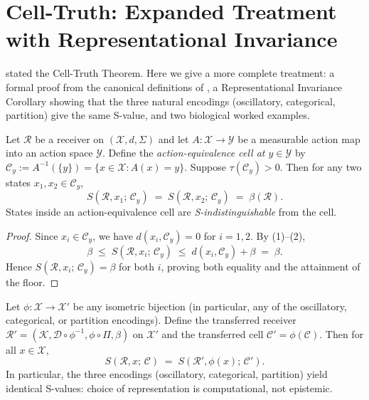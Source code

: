 \section{Cell-Truth: Expanded Treatment with Representational Invariance}
\label{sec:cell-truth-expanded}

 stated the Cell-Truth Theorem.  Here we give a more
complete treatment: a formal proof from the canonical definitions of
, a Representational
Invariance Corollary showing that the three natural encodings (oscillatory,
categorical, partition) give the same S-value, and two biological worked
examples.

\begin{theorem}
\label{thm:cell-truth-formal}
Let $\mathcal{R}$ be a receiver on $(\mathcal{X}, d, \Sigma)$ and let
$A : \mathcal{X} \to \mathcal{Y}$ be a measurable action map into an action
space $\mathcal{Y}$.  Define the \emph{action-equivalence cell at $y \in
\mathcal{Y}$} by $\mathcal{C}_y := A^{-1}(\{y\}) = \{x \in \mathcal{X} :
A(x) = y\}$.  Suppose $\tau(\mathcal{C}_y) > 0$.  Then for any two states
$x_1, x_2 \in \mathcal{C}_y$,
\[
  S(\mathcal{R}, x_1;\, \mathcal{C}_y)
  \;=\; S(\mathcal{R}, x_2;\, \mathcal{C}_y) \;=\; \beta(\mathcal{R}) .
\]
States inside an action-equivalence cell are \emph{S-indistinguishable} from
the cell.
\end{theorem}

\begin{proof}
Since $x_i \in \mathcal{C}_y$, we have $d(x_i, \mathcal{C}_y) = 0$ for
$i = 1, 2$.  By (1)--(2),
\[
  \beta \;\leq\; S(\mathcal{R}, x_i;\, \mathcal{C}_y)
  \;\leq\; d(x_i, \mathcal{C}_y) + \beta \;=\; \beta .
\]
Hence $S(\mathcal{R}, x_i;\, \mathcal{C}_y) = \beta$ for both $i$, proving
both equality and the attainment of the floor.
\end{proof}

\begin{corollary}
\label{cor:rep-invariance}
Let $\phi : \mathcal{X} \to \mathcal{X}'$ be any isometric bijection (in
particular, any of the oscillatory, categorical, or partition encodings).
Define the transferred receiver $\mathcal{R}' = (\mathcal{K}, \mathcal{D}
\circ \phi^{-1}, \phi \circ \Pi, \beta)$ on $\mathcal{X}'$ and the
transferred cell $\mathcal{C}' = \phi(\mathcal{C})$.  Then for all $x \in
\mathcal{X}$,
\[
  S(\mathcal{R}, x;\, \mathcal{C})
  \;=\; S(\mathcal{R}', \phi(x);\, \mathcal{C}') .
\]
In particular, the three encodings (oscillatory, categorical, partition) yield
identical S-values: choice of representation is computational, not epistemic.
\end{corollary}

